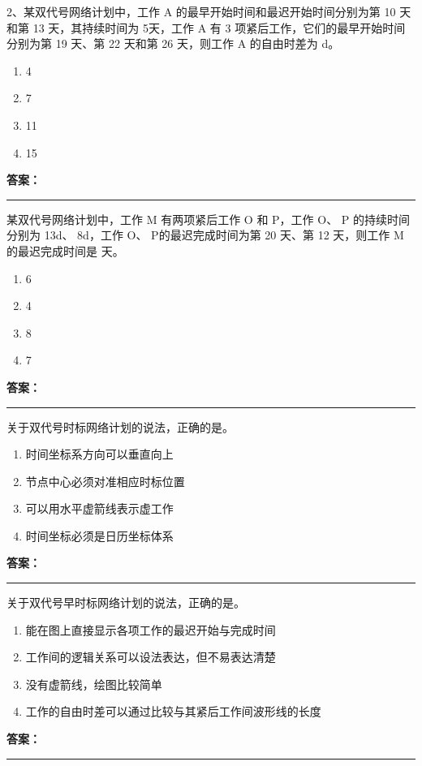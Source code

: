 \documentclass[UTF8,fontset=fandol,11pt]{ctexart}
\newcommand{\answerline}{\textcolor{answerred}{\rule{2.4cm}{0.7pt}}}
\begin{document}
\begin{quizbox}[title={第 8 题}]
2、某双代号网络计划中，工作 A 的最早开始时间和最迟开始时间分别为第 10 天和第 13 天，其持续时间为 5天，工作 A 有 3 项紧后工作，它们的最早开始时间分别为第 19 天、第 22 天和第 26 天，则工作 A 的自由时差为 d。\\
\begin{enumerate}[label=\Alph*.]
\item 4
\item 7
\item 11
\item 15
\end{enumerate}
\textbf{\textcolor{answerred}{答案：}} \answerline
\end{quizbox}

\vspace{0.2em}

\begin{quizbox}[title={第 9 题}]
某双代号网络计划中，工作 M 有两项紧后工作 O 和 P，工作 O、 P 的持续时间分别为 13d、 8d，工作 O、 P的最迟完成时间为第 20 天、第 12 天，则工作 M 的最迟完成时间是 天。\\
\begin{enumerate}[label=\Alph*.]
\item 6
\item 4
\item 8
\item 7
\end{enumerate}
\textbf{\textcolor{answerred}{答案：}} \answerline
\end{quizbox}

\vspace{0.2em}

\begin{quizbox}[title={第 10 题}]
关于双代号时标网络计划的说法，正确的是。\\
\begin{enumerate}[label=\Alph*.]
\item 时间坐标系方向可以垂直向上
\item 节点中心必须对准相应时标位置
\item 可以用水平虚箭线表示虚工作
\item 时间坐标必须是日历坐标体系
\end{enumerate}
\textbf{\textcolor{answerred}{答案：}} \answerline
\end{quizbox}

\vspace{0.2em}

\begin{quizbox}[title={第 11 题}]
关于双代号早时标网络计划的说法，正确的是。\\
\begin{enumerate}[label=\Alph*.]
\item 能在图上直接显示各项工作的最迟开始与完成时间
\item 工作间的逻辑关系可以设法表达，但不易表达清楚
\item 没有虚箭线，绘图比较简单
\item 工作的自由时差可以通过比较与其紧后工作间波形线的长度
\end{enumerate}
\textbf{\textcolor{answerred}{答案：}} \answerline
\end{quizbox}
\end{document}
